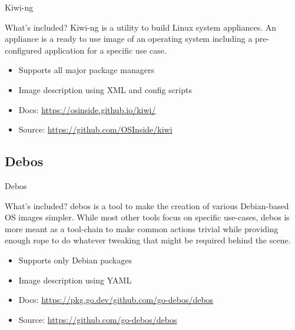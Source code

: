 \documentclass{beamer}
\begin{document}
\begin{frame}{Kiwi-ng}
	\begin{block}{What's included?} 
		Kiwi-ng is a utility to build Linux system appliances. 
		An appliance is a ready to use image of an operating system including a pre-configured application for a specific use case. 
	\end{block}

	\begin{itemize}
		\item Supports all major package managers
		\item Image description using XML and config scripts
		\item Docs: \url{https://osinside.github.io/kiwi/}
		\item Source: \url{https://github.com/OSInside/kiwi}
	\end{itemize}
\end{frame}

\subsection{Debos}

\begin{frame}{Debos}
	\begin{block}{What's included?} 
		debos is a tool to make the creation of various Debian-based OS images simpler. While most other tools focus on specific use-cases, debos is more meant as a tool-chain to make common actions trivial while providing enough rope to do whatever tweaking that might be required behind the scene.
	\end{block}
	
	\begin{itemize}
		\item Supports only Debian packages
		\item Image description using YAML
		\item Docs: \url{https://pkg.go.dev/github.com/go-debos/debos}
		\item Source: \url{https://github.com/go-debos/debos}
	\end{itemize}
\end{frame}
\end{document}
